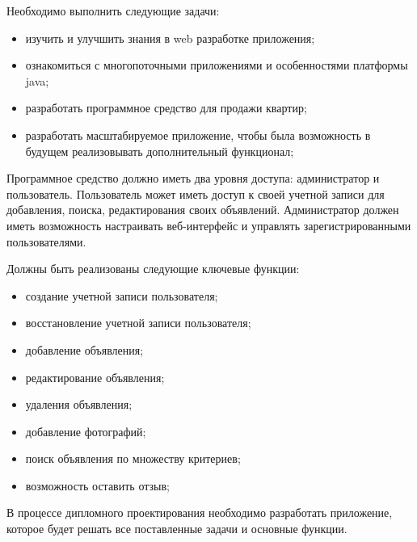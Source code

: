 Необходимо выполнить следующие задачи:

\begin{itemize}
	\item изучить и улучшить знания в web разработке приложения;
	\item ознакомиться с многопоточными приложениями и особенностями платформы java;
	\item разработать программное средство для продажи квартир; 
	\item разработать масштабируемое приложение, чтобы была возможность в будущем реализовывать дополнительный функционал;
\end{itemize}

Программное средство должно иметь два уровня доступа: администратор и пользователь. Пользователь может иметь доступ к своей учетной записи для добавления, поиска, редактирования своих объявлений. Администратор должен иметь возможность настраивать веб-интерфейс и управлять зарегистрированными пользователями.

Должны быть реализованы следующие ключевые функции:

\begin{itemize}
	\item создание учетной записи пользователя;
	\item восстановление учетной записи пользователя;
	\item добавление объявления;
	\item редактирование объявления;
	\item удаления  объявления;
	\item добавление фотографий;
	\item поиск объявления по множеству критериев;
	\item возможность оставить отзыв;
\end{itemize}

В процессе дипломного проектирования необходимо разработать приложение, которое будет решать все поставленные задачи и основные функции.
